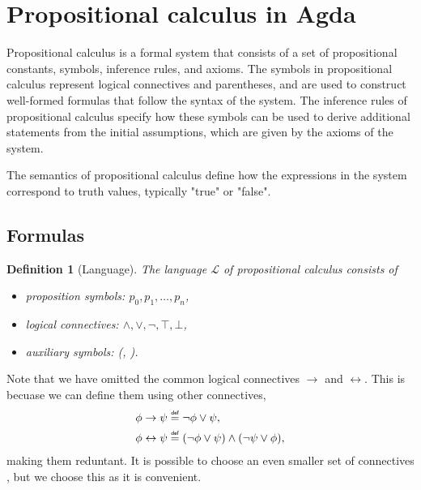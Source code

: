 \documentclass[titlepage]{article}
\newcommand\myeq{\mathrel{\overset{\makebox[0pt]{\mbox{\normalfont\tiny\sffamily def}}}{=}}}
\newtheorem{definition}{Definition}[section]
\begin{document}

\section{Propositional calculus in Agda}

Propositional calculus is a formal system that consists of a set of propositional constants, symbols, inference rules, and axioms. The symbols in propositional calculus represent logical connectives and parentheses, and are used to construct well-formed formulas that follow the syntax of the system. The inference rules of propositional calculus specify how these symbols can be used to derive additional statements from the initial assumptions, which are given by the axioms of the system.

The semantics of propositional calculus define how the expressions in the system correspond to truth values, typically "true" or "false". 



\subsection{Formulas}

\begin{definition}[Language]\label{language}
    The language $\mathcal{L}$ of propositional calculus consists of
    \begin{itemize}
        \item proposition symbols: $p_0,p_1,\hdots,p_n$,
        \item logical connectives: $\wedge,\vee,\neg,\top,\bot$,
        \item auxiliary symbols: (, ).
    \end{itemize}
\end{definition}

Note that we have omitted the common logical connectives $\rightarrow$ and $\leftrightarrow$. This is becuase we can define them using other connectives, 
\begin{align*}
    \phi \rightarrow \psi &\myeq \neg \phi \vee \psi, \\
    \phi \leftrightarrow \psi &\myeq (\neg \phi \vee \psi) \wedge (\neg \psi \vee \phi),
\end{align*}making them reduntant. It is possible to choose an even smaller set of connectives \cite{vanDalen}, but we choose this as it is convenient.
\end{document}
